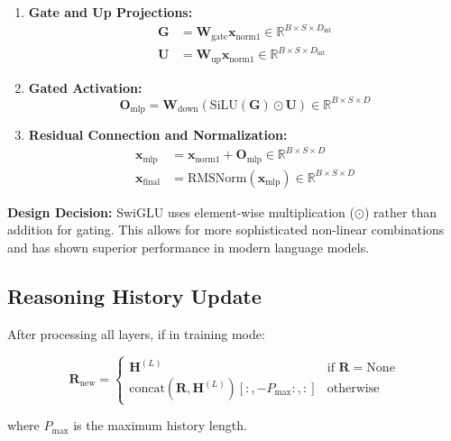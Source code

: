 \documentclass{article}
\begin{document}
\begin{enumerate}
\item \textbf{Gate and Up Projections:}
\begin{align}
\mathbf{G} &= \mathbf{W}_{\text{gate}} \mathbf{x}_{\text{norm1}} \in \mathbb{R}^{B \times S \times D_{\text{int}}} \\
\mathbf{U} &= \mathbf{W}_{\text{up}} \mathbf{x}_{\text{norm1}} \in \mathbb{R}^{B \times S \times D_{\text{int}}}
\end{align}

\item \textbf{Gated Activation:}
\begin{equation}
\mathbf{O}_{\text{mlp}} = \mathbf{W}_{\text{down}} (\text{SiLU}(\mathbf{G}) \odot \mathbf{U}) \in \mathbb{R}^{B \times S \times D}
\end{equation}

\item \textbf{Residual Connection and Normalization:}
\begin{align}
\mathbf{x}_{\text{mlp}} &= \mathbf{x}_{\text{norm1}} + \mathbf{O}_{\text{mlp}} \in \mathbb{R}^{B \times S \times D} \\
\mathbf{x}_{\text{final}} &= \text{RMSNorm}(\mathbf{x}_{\text{mlp}}) \in \mathbb{R}^{B \times S \times D}
\end{align}
\end{enumerate}

\textbf{Design Decision:} SwiGLU uses element-wise multiplication ($\odot$) rather than addition for gating. This allows for more sophisticated non-linear combinations and has shown superior performance in modern language models.

\subsection{Reasoning History Update}

After processing all layers, if in training mode:

\begin{equation}
\mathbf{R}_{\text{new}} = \begin{cases}
\mathbf{H}^{(L)} & \text{if } \mathbf{R} = \text{None} \\
\text{concat}(\mathbf{R}, \mathbf{H}^{(L)})[:, -P_{\max}:, :] & \text{otherwise}
\end{cases}
\end{equation}

where $P_{\max}$ is the maximum history length.
\end{document}
